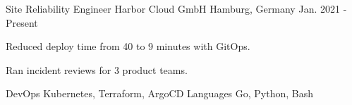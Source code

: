 \documentclass[11pt, a4paper]{awesome-cv}
\begin{document}
\makecvheader
{}
\begin{cventries}
  \cventry
    {Site Reliability Engineer} %
    {Harbor Cloud GmbH} %
    {Hamburg, Germany} %
    {Jan. 2021 - Present} %
    {
      \begin{cvitems} %
        \item {Reduced deploy time from 40 to 9 minutes with GitOps.}
        \item {Ran incident reviews for 3 product teams.}
      \end{cvitems}
    }
\end{cventries}
\begin{cvskills}
  \cvskill
    {DevOps} %
    {Kubernetes, Terraform, ArgoCD} %
  \cvskill
    {Languages} %
    {Go, Python, Bash} %
\end{cvskills}
\end{document}

